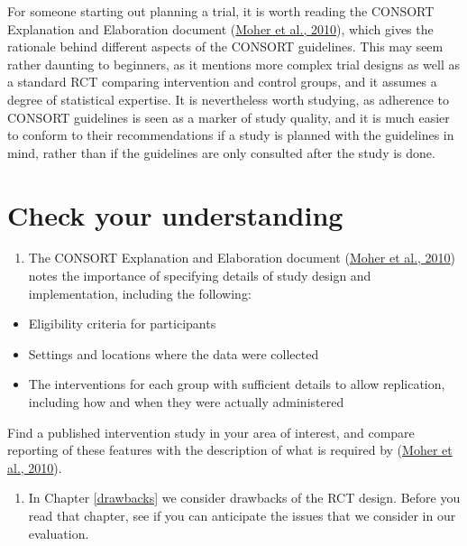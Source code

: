 \documentclass{krantz}
\providecommand{\tightlist}{%
\setlength{\itemsep}{0pt}\setlength{\parskip}{0pt}}
\begin{document}
For someone starting out planning a trial, it is worth reading the CONSORT Explanation and Elaboration document (\protect\hyperlink{ref-moher2010}{Moher et al., 2010}), which gives the rationale behind different aspects of the CONSORT guidelines. This may seem rather daunting to beginners, as it mentions more complex trial designs as well as a standard RCT comparing intervention and control groups, and it assumes a degree of statistical expertise. It is nevertheless worth studying, as adherence to CONSORT guidelines is seen as a marker of study quality, and it is much easier to conform to their recommendations if a study is planned with the guidelines in mind, rather than if the guidelines are only consulted after the study is done.

\hypertarget{check-your-understanding-9}{%
\section{Check your understanding}\label{check-your-understanding-9}}

\begin{enumerate}
\def\labelenumi{\arabic{enumi}.}
\tightlist
\item
  The CONSORT Explanation and Elaboration document (\protect\hyperlink{ref-moher2010}{Moher et al., 2010}) notes the importance of specifying details of study design and implementation, including the following:
\end{enumerate}

\begin{itemize}
\tightlist
\item
  Eligibility criteria for participants\\
\item
  Settings and locations where the data were collected
\item
  The interventions for each group with sufficient details to allow replication, including how and when they were actually administered
\end{itemize}

Find a published intervention study in your area of interest, and compare reporting of these features with the description of what is required by (\protect\hyperlink{ref-moher2010}{Moher et al., 2010}).

\begin{enumerate}
\def\labelenumi{\arabic{enumi}.}
\setcounter{enumi}{1}
\tightlist
\item
  In Chapter \ref{drawbacks} we consider drawbacks of the RCT design. Before you read that chapter, see if you can anticipate the issues that we consider in our evaluation.
\end{enumerate}
\end{document}
